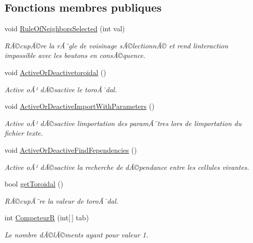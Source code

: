 \subsection*{Fonctions membres publiques}
\begin{DoxyCompactItemize}
\item 
void \mbox{\hyperlink{class_parameters_af47f2d06943667d50ffbc35743ad522c}{Rule\+Of\+Neighbors\+Selected}} (int val)
\begin{DoxyCompactList}\small\item\em RÃ©cupÃ©re la rÃ¨gle de voisinage sÃ©lectionnÃ© et rend l\textquotesingle{}interaction impossible avec les boutons en consÃ©quence. \end{DoxyCompactList}\item 
void \mbox{\hyperlink{class_parameters_aed80d6c22fb47d55466f2feff304c87b}{Active\+Or\+Deactivetoroidal}} ()
\begin{DoxyCompactList}\small\item\em Active oÃ¹ dÃ©sactive le toroÃ¯dal. \end{DoxyCompactList}\item 
void \mbox{\hyperlink{class_parameters_a4566221c7993c122d2d32682530f1083}{Active\+Or\+Deactive\+Import\+With\+Parameters}} ()
\begin{DoxyCompactList}\small\item\em Active oÃ¹ dÃ©sactive l\textquotesingle{}importation des paramÃ¨tres lors de l\textquotesingle{}importation du fichier texte. \end{DoxyCompactList}\item 
void \mbox{\hyperlink{class_parameters_a23cd831787b627f7ec96da88a774838d}{Active\+Or\+Deactive\+Find\+Fependencies}} ()
\begin{DoxyCompactList}\small\item\em Active oÃ¹ dÃ©sactive la recherche de dÃ©pendance entre les cellules vivantes. \end{DoxyCompactList}\item 
bool \mbox{\hyperlink{class_parameters_aa6714e2b56d3511340476f682a51e677}{get\+Toroidal}} ()
\begin{DoxyCompactList}\small\item\em RÃ©cupÃ¨re la valeur de toroÃ¯dal. \end{DoxyCompactList}\item 
int \mbox{\hyperlink{class_parameters_a9eb50f6a67cb480f303e5d6f91997f7d}{CompeteurR}} (int\mbox{[}$\,$\mbox{]} tab)
\begin{DoxyCompactList}\small\item\em Le nombre d\textquotesingle{}Ã©lÃ©ments ayant pour valeur 1. \end{DoxyCompactList}\item 

\end{DoxyCompactItemize}
